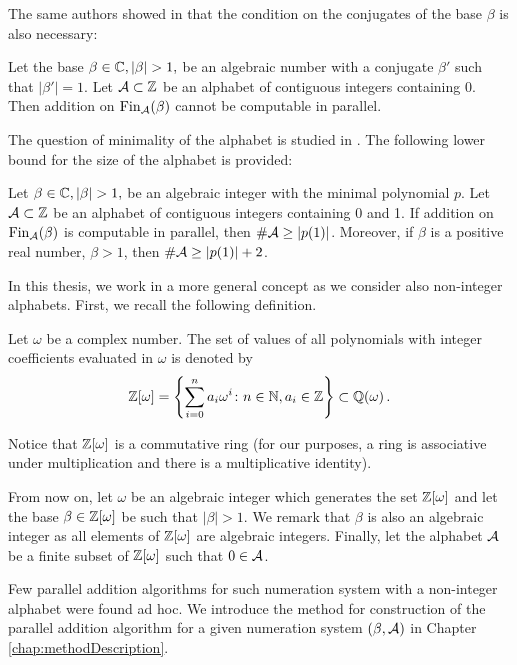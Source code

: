 \begin{upravit}
The same authors showed in \cite{kBlock} that the condition on the conjugates of the base $\beta$ is also necessary:
  \begin{thm}
  Let the base $\beta\in\CC, |\beta|>1,$ be an algebraic number with a conjugate $\beta'$ such that $|\beta'|=1$. Let $\mathcal{A}\subset\mathbb{Z}$ be an alphabet of contiguous integers containing 0. Then addition on $\text{Fin}_{\mathcal{A}}(\beta)$ cannot be computable in parallel.
  \end{thm}
  
The question of minimality of the alphabet is studied in \cite{minAlph}. The following lower bound for the size of the alphabet is provided:
  \begin{thm}
  \label{thm:lowerBoundAlphabet}
  Let $\beta\in\CC, |\beta|>1,$  be an algebraic integer with the minimal polynomial $p$. Let $\mathcal{A}\subset\mathbb{Z}$ be an alphabet of contiguous integers containing 0 and 1. If addition on $\text{Fin}_{\mathcal{A}}(\beta)$ is computable in parallel, then $\#\mathcal{A} \geq |p(1)|$. Moreover, if $\beta$ is a positive real number, $\beta>1$, then $\#\mathcal{A} \geq  |p(1)|+2$.
  \end{thm}
  

In this thesis, we work in a more general concept as we consider also non-integer alphabets. First, we recall the following definition.
\begin{defn}
Let $\omega$ be a complex number. The set of values of all polynomials with integer coefficients evaluated in $\omega$ is denoted by
$$
    \mathbb{Z}[\omega] =\left\{\sum_{i=0}^n a_i \omega^i\colon n\in\mathbb{N}, a_i\in\mathbb{Z} \right\} \subset \mathbb{Q}(\omega)\,.
$$
\end{defn}
 Notice that $\mathbb{Z}[\omega]$ is a commutative ring (for our purposes, a ring is associative under multiplication and there is a multiplicative identity).     
    
From now on, let $\omega$ be an algebraic integer  which generates the set $\mathbb{Z}[\omega]$ and let the base $\beta\in\mathbb{Z}[\omega]$ be such that $|\beta|>1$. We remark that $\beta$ is also an algebraic integer as all elements of $\mathbb{Z}[\omega]$ are algebraic integers. Finally, let the alphabet $\mathcal{A}$ be a finite subset of $\mathbb{Z}[\omega]$ such that $0\in\mathcal{A}$.

Few parallel addition algorithms for such numeration system with a non-integer alphabet were found ad hoc. We introduce the method for construction of the parallel addition algorithm for a given numeration system $(\beta,\mathcal{A})$ in Chapter \ref{chap:methodDescription}. 

\end{upravit}